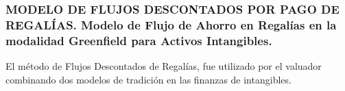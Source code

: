 \begin{rightcolumn}
\subsubsection*{MODELO DE FLUJOS DESCONTADOS POR PAGO DE REGALÍAS. Modelo de Flujo de Ahorro en Regalías en la modalidad Greenfield para Activos Intangibles.}

El método de Flujos Descontados de Regalías, fue utilizado por el valuador combinando dos modelos de tradición en las finanzas de intangibles. 
\end{rightcolumn}